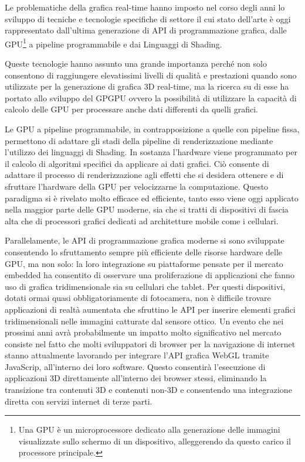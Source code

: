 Le problematiche della grafica real-time hanno imposto nel corso degli anni lo sviluppo di tecniche e tecnologie specifiche di settore il cui stato dell'arte \`e oggi rappresentato dall'ultima generazione di \ac{API} di programmazione grafica, dalle \ac{GPU}\footnote{Una \ac{GPU} \`e un microprocessore dedicato alla generazione delle immagini visualizzate sullo schermo di un dispositivo, alleggerendo da questo carico il processore principale.} a pipeline programmabile e dai Linguaggi di Shading.

Queste tecnologie hanno assunto una grande importanza perch\'e non solo consentono di raggiungere elevatissimi livelli di qualit\`a e prestazioni quando sono utilizzate per la generazione di grafica 3D real-time, ma la ricerca su di esse ha portato allo sviluppo del \ac{GPGPU} ovvero la possibilit\`a di utilizzare la capacit\`a di calcolo delle \ac{GPU} per processare anche dati differenti da quelli grafici.

Le \ac{GPU} a pipeline programmabile, in contrapposizione a quelle con pipeline fissa, permettono di adattare gli stadi della pipeline di renderizzazione mediante l'utilizzo dei linguaggi di Shading. In sostanza l'hardware viene programmato per il calcolo di algoritmi specifici da applicare ai dati grafici. Ci\`o consente di adattare il processo di renderizzazione agli effetti che si desidera ottenere e di sfruttare l'hardware della \ac{GPU} per velocizzarne la computazione. Questo paradigma si \`e rivelato molto efficace ed efficiente, tanto esso viene oggi applicato nella maggior parte delle \ac{GPU} moderne, sia che si tratti di dispositivi di fascia alta che di processori grafici dedicati ad architetture mobile come i cellulari.

Parallelamente, le \ac{API} di programmazione grafica moderne si sono sviluppate consentendo lo sfruttamento sempre pi\`u efficiente delle risorse hardware delle \ac{GPU}, ma non solo: la loro integrazione su piattaforme pensate per il mercato embedded ha consentito di osservare una proliferazione di applicazioni che fanno uso di grafica tridimensionale sia su cellulari che tablet. Per questi dispositivi, dotati ormai quasi obbligatoriamente di fotocamera, non \`e difficile trovare applicazioni di realt\`a aumentata che sfruttino le \ac{API} per inserire elementi grafici tridimensionali nelle immagini catturate dal sensore ottico. Un evento che nei prossimi anni avr\`a probabilmente un impatto molto significativo nel mercato consiste nel fatto che molti sviluppatori di browser per la navigazione di internet stanno attualmente lavorando per integrare l'\ac{API} grafica WebGL tramite JavaScrip, all'interno dei loro software. Questo consentir\`a l'esecuzione di applicazioni 3D direttamente all'interno dei browser stessi, eliminando la transizione tra contenuti 3D e contenuti non-3D e consentendo una integrazione diretta con servizi internet di terze parti.

